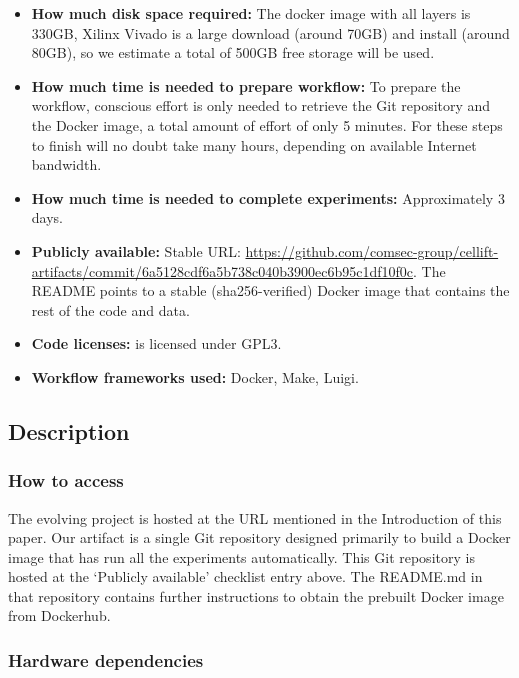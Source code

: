 \documentclass[letterpaper,twocolumn,10pt]{article}
\begin{document}
{\begin{itemize}
  \item {\bf How much disk space required: } The docker image with all layers is 330GB, Xilinx Vivado is a large download (around 70GB) and install (around 80GB), so we estimate a total of 500GB free storage will be used.
  \item {\bf How much time is needed to prepare workflow: } To prepare the workflow, conscious effort is only needed to retrieve the Git repository and the Docker image, a total amount of effort of only 5 minutes. For these steps to finish will no doubt take many hours, depending on available Internet bandwidth.
  \item {\bf How much time is needed to complete experiments: } Approximately 3 days. 
  \item {\bf Publicly available: } Stable URL: \url{https://github.com/comsec-group/cellift-artifacts/commit/6a5128cdf6a5b738c040b3900ec6b95c1df10f0c}. The README points to a stable (sha256-verified) Docker image that contains the rest of the code and data.
  \item {\bf Code licenses: } \ourname is licensed under GPL3. 
  \item {\bf Workflow frameworks used: } Docker, Make, Luigi. 
\end{itemize}

\subsection{Description}


\subsubsection{How to access}

The evolving project is hosted at the URL mentioned in the Introduction
of this paper. Our artifact is a single Git repository designed primarily to
build a Docker image that has run all the experiments automatically. This
Git repository is hosted at the `Publicly available' checklist entry above.
The README.md in that repository contains further instructions to obtain the
prebuilt Docker image from Dockerhub.

\subsubsection{Hardware dependencies}

}
\end{document}
